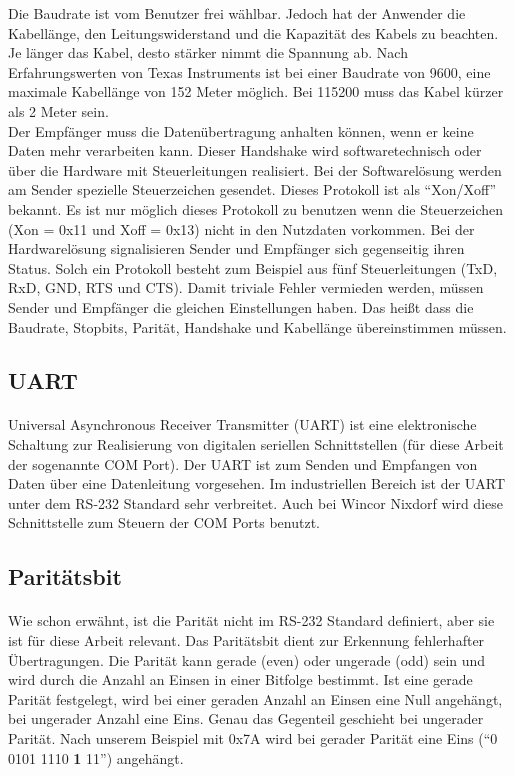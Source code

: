 Die Baudrate ist vom Benutzer frei wählbar. Jedoch hat der Anwender die Kabellänge, den Leitungswiderstand und die Kapazität des Kabels zu beachten. Je länger das Kabel, desto stärker nimmt die Spannung ab. Nach Erfahrungswerten von Texas Instruments ist bei einer Baudrate von 9600, eine maximale Kabellänge von 152 Meter möglich. Bei 115200 muss das Kabel kürzer als 2 Meter sein.\\

Der Empfänger muss die Datenübertragung anhalten können, wenn er keine Daten mehr verarbeiten kann. Dieser Handshake wird softwaretechnisch oder über die Hardware mit Steuerleitungen realisiert. Bei der Softwarelösung werden am Sender spezielle Steuerzeichen gesendet. Dieses Protokoll ist als "`Xon/Xoff"' bekannt. Es ist nur möglich dieses Protokoll zu benutzen wenn die Steuerzeichen (Xon = 0x11 und Xoff = 0x13) nicht in den Nutzdaten vorkommen. Bei der Hardwarelösung signalisieren Sender und Empfänger sich gegenseitig ihren Status. Solch ein  Protokoll besteht zum Beispiel aus fünf Steuerleitungen (TxD, RxD, GND, RTS und CTS). Damit triviale Fehler vermieden werden, müssen Sender und Empfänger die gleichen Einstellungen haben. Das heißt dass die Baudrate, Stopbits, Parität, Handshake und Kabellänge übereinstimmen müssen.


\subsection{UART}
\paragraph{}
Universal Asynchronous Receiver Transmitter (UART) ist eine elektronische Schaltung zur Realisierung von digitalen seriellen Schnittstellen (für diese Arbeit der sogenannte COM Port). Der UART ist zum Senden und Empfangen von Daten über eine Datenleitung vorgesehen. Im industriellen Bereich ist der UART unter dem RS-232 Standard sehr verbreitet. Auch bei Wincor Nixdorf wird diese Schnittstelle zum Steuern der COM Ports benutzt.

\subsection{Paritätsbit}
\paragraph{}
Wie schon erwähnt, ist die Parität nicht im RS-232 Standard definiert, aber sie ist für diese Arbeit relevant. Das Paritätsbit dient zur Erkennung fehlerhafter Übertragungen. Die Parität kann gerade (even) oder ungerade (odd) sein und wird durch die Anzahl an Einsen in einer Bitfolge bestimmt. Ist eine gerade Parität festgelegt, wird bei einer geraden Anzahl an Einsen eine Null angehängt, bei ungerader Anzahl eine Eins. Genau das Gegenteil geschieht bei  ungerader Parität. Nach unserem Beispiel mit 0x7A wird bei gerader Parität eine Eins ("`0 0101 1110 \textbf{1} 11"') angehängt.

